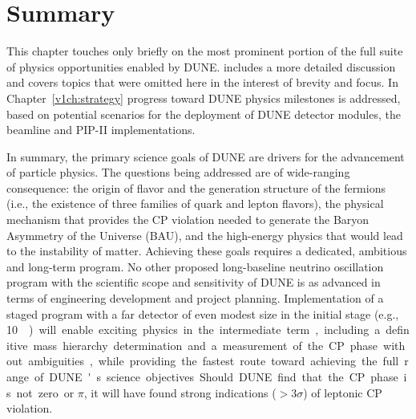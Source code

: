 
%
\section{Summary}


This chapter %
touches only briefly on the most prominent portion of
the full suite of physics opportunities enabled by DUNE.  
\volphys includes a more detailed discussion and covers topics %
that were omitted here in the interest of brevity and focus.  In
Chapter~\ref{v1ch:strategy} progress toward DUNE physics milestones is
addressed, based on potential scenarios for the deployment of DUNE
detector modules, the beamline and PIP-II implementations. 

In summary, the primary science goals of DUNE are drivers for the advancement of
particle physics. The questions being addressed are of wide-ranging
consequence: the origin of flavor and the generation structure of the
fermions (i.e., the existence of three families of quark and lepton
flavors), the physical mechanism that provides the CP violation needed
to generate the Baryon Asymmetry of the Universe (BAU), and the high-energy
physics that would lead to the instability of matter.  Achieving these
goals requires a dedicated, ambitious and long-term program.  No other
proposed long-baseline neutrino oscillation program with the
scientific scope and sensitivity of DUNE is as advanced in terms of
engineering development and project planning.  Implementation of a
staged program with a far detector of even modest size in the initial
stage (e.g., \SI{10}\kt) will enable exciting physics in the intermediate
term, including a definitive mass hierarchy determination and a
measurement of the CP phase without ambiguities, while providing the
fastest route toward achieving the full range of DUNE's science
objectives.  Should DUNE find that the CP phase is not zero or $\pi$,
it will have found strong indications ($>3\sigma$) of leptonic CP
violation.

